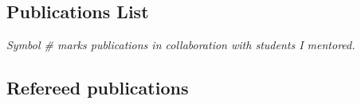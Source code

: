 

\vspace{-4mm}

\subsection*{\LARGE{Publications  List}}

\vspace{3mm}

\textit{Symbol \# marks publications in collaboration with students I mentored.}

\vspace{2mm}

\subsection*{ Refereed publications}

